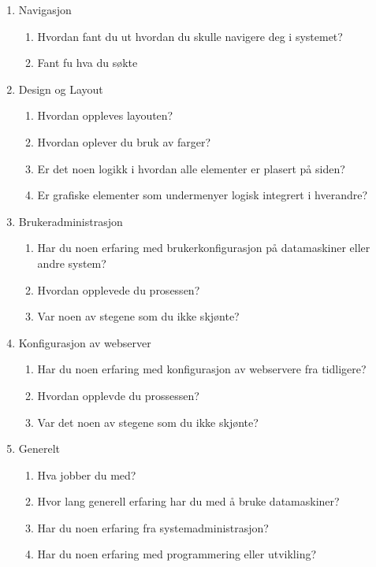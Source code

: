 \begin{enumerate}
\setlength{\itemsep}{1pt}
\setlength{\parskip}{0pt}
\setlength{\parsep}{0pt}
\item Navigasjon
\begin{enumerate}
\item Hvordan fant du ut hvordan du skulle navigere deg i systemet?
\item Fant fu hva du søkte 
\end{enumerate}
\item Design og Layout
\begin{enumerate}
\item Hvordan oppleves layouten?
\item Hvordan oplever du bruk av farger?
\item Er det noen logikk i hvordan alle elementer er plasert på siden?
\item Er grafiske elementer som undermenyer logisk integrert i hverandre?
\end{enumerate}
\item Brukeradministrasjon
\begin{enumerate}
\item Har du noen erfaring med brukerkonfigurasjon på datamaskiner eller andre system?
\item Hvordan opplevede du prosessen?
\item Var noen av stegene som du ikke skjønte?
\end{enumerate}
\item Konfigurasjon av webserver
\begin{enumerate}
\item Har du noen erfaring med konfigurasjon av webservere fra tidligere?
\item Hvordan opplevde du prossessen?
\item Var det noen av stegene som du ikke skjønte?
\end{enumerate}
\item Generelt
\begin{enumerate}
\item Hva jobber du med?
\item Hvor lang generell erfaring har du med å bruke datamaskiner?
\item Har du noen erfaring fra systemadministrasjon?
\item Har du noen erfaring med programmering eller utvikling?
\end{enumerate}
\end{enumerate}

